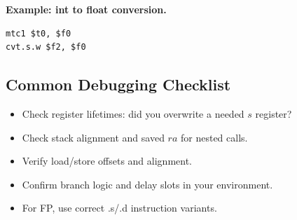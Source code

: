 \documentclass[11pt]{article}
\begin{document}
\textbf{Example: int to float conversion.}
\begin{verbatim}
mtc1 $t0, $f0
cvt.s.w $f2, $f0
\end{verbatim}

\subsection{Common Debugging Checklist}
\begin{itemize}[leftmargin=*]
  \item Check register lifetimes: did you overwrite a needed $s$ register?
  \item Check stack alignment and saved $ra$ for nested calls.
  \item Verify load/store offsets and alignment.
  \item Confirm branch logic and delay slots in your environment.
  \item For FP, use correct .s/.d instruction variants.
\end{itemize}
\end{document}
